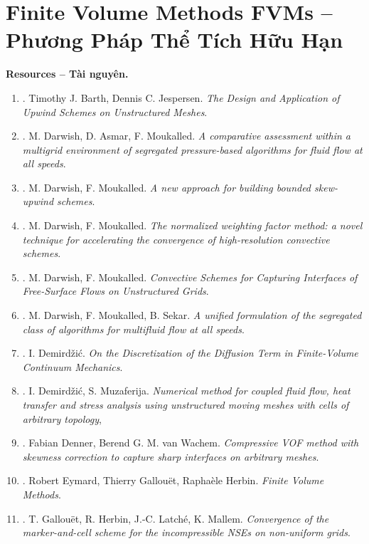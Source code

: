 \documentclass{article}
\begin{document}
\section{Finite Volume Methods FVMs -- Phương Pháp Thể Tích Hữu Hạn}
\textbf{\textsf{Resources -- Tài nguyên.}}
\begin{enumerate}
	\item \cite{Barth_Jespersen1989}. {\sc Timothy J. Barth, Dennis C. Jespersen}. {\it The Design and Application of Upwind Schemes on Unstructured Meshes}.
	\item \cite{Darwish_Asmar_Moukalled2004}. {\sc M. Darwish, D. Asmar, F. Moukalled}. {\it A comparative assessment within a multigrid environment of segregated pressure-based algorithms for fluid flow at all speeds}.
	\item \cite{Darwish_Moukalled1996}. {\sc M. Darwish, F. Moukalled}. {\it A new approach for building bounded skew-upwind schemes}.
	\item \cite{Darwish_Moukalled1996a}. {\sc M. Darwish, F. Moukalled}. {\it The normalized weighting factor method: a novel technique for accelerating the convergence of high-resolution convective schemes}.
	\item \cite{Darwish_Moukalled2006}. {\sc M. Darwish, F. Moukalled}. {\it Convective Schemes for Capturing Interfaces of Free-Surface Flows on Unstructured Grids}.
	\item \cite{Darwish_Moukalled_Sekar2001}. {\sc M. Darwish, F. Moukalled, B. Sekar}. {\it A unified formulation of the segregated class of algorithms for multifluid flow at all speeds}.
	\item \cite{Demirdzic2015}. {\sc I. Demird\v{z}i\'c}. {\it On the Discretization of the Diffusion Term in Finite-Volume Continuum Mechanics}.
	\item \cite{Demirdzic_Muzaferija1995}. {\sc I. Demird\v{z}i\'c, S. Muzaferija}. {\it Numerical method for coupled fluid flow, heat transfer and stress analysis using unstructured moving meshes with cells of arbitrary topology},
	\item \cite{Denner_vanWachem2014}. {\sc Fabian Denner, Berend G. M. van Wachem}. {\it Compressive VOF method with skewness correction to capture sharp interfaces on arbitrary meshes}.
	\item \cite{Eymard_Gallouet_Herbin2019}. {\sc Robert Eymard, Thierry Gallou\"et, Rapha\`ele Herbin}. {\it Finite Volume Methods}.
	\item \cite{Gallouet_Herbin_Latche_Mallem2018}. {\sc T. Gallou\"{e}t, R. Herbin, J.-C. Latch\'{e},  K. Mallem}. {\it Convergence of the marker-and-cell scheme for the incompressible NSEs on non-uniform grids}.

\end{enumerate}
\end{document}
